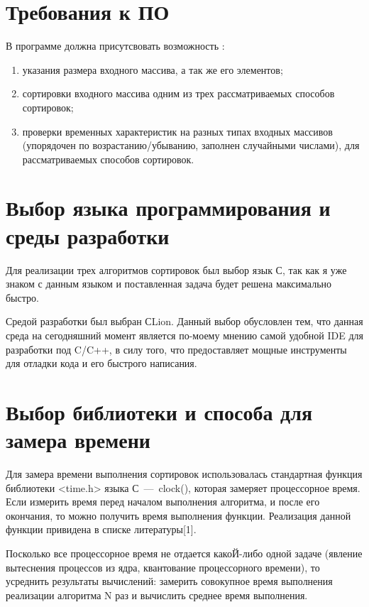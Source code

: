 \documentclass[a4paper,12pt]{report}
\begin{document}
	\section{Требования к ПО}
	
	В программе должна присутсвовать возможность :
	
	\begin{enumerate}
		\item указания размера входного массива, а так же его элементов;
		\item сортировки входного массива одним из трех рассматриваемых способов сортировок;
		\item проверки временных характеристик на разных типах входных массивов (упорядочен по возрастанию/убыванию, заполнен случайными числами), для рассматриваемых способов сортировок.
	\end{enumerate}
	
	\section{Выбор языка программирования и среды разработки}
	
	Для реализации трех алгоритмов сортировок был выбор язык С, так как я уже знаком с данным языком и поставленная задача будет решена максимально быстро.

	Средой разработки был выбран СLion. Данный выбор обусловлен тем, что данная среда на сегодняшний момент является по-моему мнению самой удобной IDE для разработки под C/C++, в силу того, что предоставляет мощные инструменты для отладки кода и его быстрого написания. 
	
	\section{Выбор библиотеки и способа для замера времени}
		Для замера времени выполнения сортировок использовалась стандартная функция библиотеки <time.h> языка С~---~clock(), которая замеряет процессорное время. Если измерить время перед началом выполнения алгоритма, и после его окончания, то можно получить время выполнения функции. Реализация данной функции привидена в списке литературы[1].
		
		Посколько все процессорное время не отдается какоЙ-либо одной задаче (явление вытеснения процессов из ядра, квантование процессорного времени), то усреднить результаты вычислений: замерить совокупное время выполнения реализации алгоритма N раз и вычислить среднее время выполнения.
		
\end{document}
